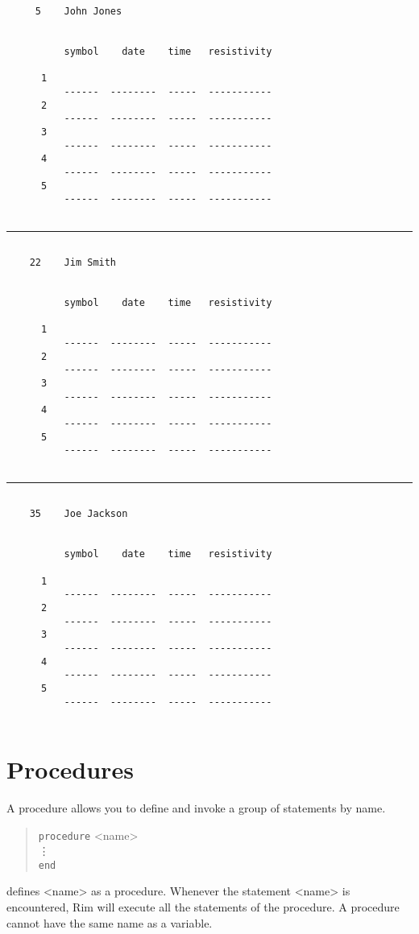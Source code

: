 \documentclass[11pt,a4paper]{report}
\begin{document}
\begin{verbatim}
     5    John Jones
 
 
          symbol    date    time   resistivity
 
      1
          ------  --------  -----  -----------
      2
          ------  --------  -----  -----------
      3
          ------  --------  -----  -----------
      4
          ------  --------  -----  -----------
      5
          ------  --------  -----  -----------
 
\end{verbatim}
\hrule
\begin{verbatim}
 
    22    Jim Smith
 
 
          symbol    date    time   resistivity
 
      1
          ------  --------  -----  -----------
      2
          ------  --------  -----  -----------
      3
          ------  --------  -----  -----------
      4
          ------  --------  -----  -----------
      5
          ------  --------  -----  -----------
 
\end{verbatim}
\hrule
\begin{verbatim}
 
    35    Joe Jackson
 
 
          symbol    date    time   resistivity
 
      1
          ------  --------  -----  -----------
      2
          ------  --------  -----  -----------
      3
          ------  --------  -----  -----------
      4
          ------  --------  -----  -----------
      5
          ------  --------  -----  -----------
 
\end{verbatim}
 
\section{Procedures}
%
A procedure allows you to define and
invoke a group of statements by name.
\begin{verse}
  \verb!procedure! <name> \\
  \qquad\vdots\\
  \verb!end! 
\end{verse}
defines <name> as a procedure.  Whenever the statement
<name>
is encountered, Rim will execute all the statements of the
procedure.
A procedure cannot have the same name as a variable.
 
\end{document}
